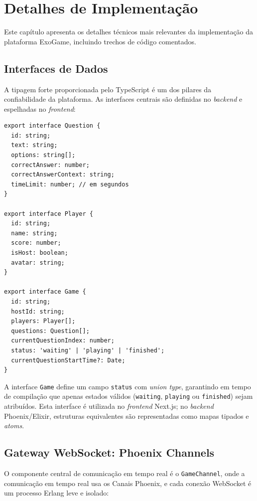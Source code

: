 \documentclass[
	12pt,
	openany,
	oneside,
	a4paper,
	english,
	brazil
]{abntex2}
\begin{document}
\chapter{Detalhes de Implementação}\label{cap:implementacao}

Este capítulo apresenta os detalhes técnicos mais relevantes da implementação da plataforma ExoGame, incluindo trechos de código comentados.

\section{Interfaces de Dados}

A tipagem forte proporcionada pelo TypeScript é um dos pilares da confiabilidade da plataforma. As interfaces centrais são definidas no \textit{backend} e espelhadas no \textit{frontend}:

\begin{lstlisting}[caption={Interfaces principais do sistema (game.interface.ts)}, label={lst:interfaces}]
export interface Question {
  id: string;
  text: string;
  options: string[];
  correctAnswer: number;
  correctAnswerContext: string;
  timeLimit: number; // em segundos
}

export interface Player {
  id: string;
  name: string;
  score: number;
  isHost: boolean;
  avatar: string;
}

export interface Game {
  id: string;
  hostId: string;
  players: Player[];
  questions: Question[];
  currentQuestionIndex: number;
  status: 'waiting' | 'playing' | 'finished';
  currentQuestionStartTime?: Date;
}
\end{lstlisting}

A interface \texttt{Game} define um campo \texttt{status} com \textit{union type}, garantindo em tempo de compilação que apenas estados válidos (\texttt{waiting}, \texttt{playing} ou \texttt{finished}) sejam atribuídos. Esta interface é utilizada no \textit{frontend} Next.js; no \textit{backend} Phoenix/Elixir, estruturas equivalentes são representadas como mapas tipados e \textit{atoms}.

\section{Gateway WebSocket: Phoenix Channels}

O componente central de comunicação em tempo real é o \texttt{GameChannel}, onde a comunicação em tempo real usa os Canais Phoenix, e cada conexão WebSocket é um processo Erlang leve e isolado:
\end{document}
